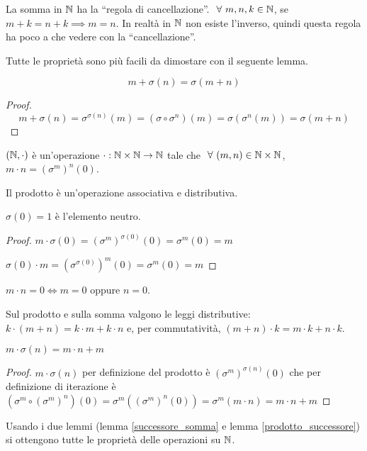 La somma in $\mathbb{N}$ ha la ``regola di cancellazione''. $\forall m, n, k \in \naturals$, se $m + k = n + k \implies m = n$. In realt\`a in $\mathbb{N}$ non esiste l'inverso, quindi questa regola ha poco a che vedere con la ``cancellazione''.

Tutte le propriet\`a sono pi\`u facili da dimostare con il seguente lemma.
\begin{lem}\label{successore_somma}
\[
m + \sigma (n) = \sigma(m + n)
\]
\end{lem}
\begin{proof}
\[
m + \sigma(n) = \sigma^{\sigma(n)} (m) = (\sigma \circ \sigma^n) (m) = \sigma ( \sigma^n (m) ) = \sigma(m + n)
\]
\end{proof}
\begin{defn}
$(\mathbb{N}, \cdot)$ \`e un'operazione $\cdot : \mathbb{N} \times \mathbb{N} \to \mathbb{N}$ tale che $\forall (m, n) \in \naturals \times \naturals$, $m \cdot n = (\sigma^m)^n(0)$.
\end{defn}
Il prodotto \`e un'operazione associativa e distributiva.

\begin{prop}
$\sigma(0) = 1$ \`e l'elemento neutro.
\end{prop}
\begin{proof}
$m \cdot \sigma(0) = (\sigma^m)^{\sigma(0)} (0) = \sigma^m (0) = m$

$\sigma(0) \cdot m = (\sigma^{\sigma(0)})^m (0) = \sigma^m (0) = m$
\end{proof}

\begin{defn}
$m \cdot n = 0 \iff m = 0 $ oppure $ n = 0 $.
\end{defn}

Sul prodotto e sulla somma valgono le leggi distributive: $k \cdot (m+n) = k \cdot m + k \cdot n$ e, per commutativit\`a, $(m + n) \cdot k = m \cdot k + n \cdot k$.
\begin{lem}\label{prodotto_successore}
$m \cdot \sigma(n) = m \cdot n + m$
\end{lem}
\begin{proof}
$m \cdot \sigma(n)$ per definizione del prodotto \`e $ (\sigma^m)^{\sigma(n)} (0) $ che per definizione di iterazione \`e $ (\sigma^m \circ (\sigma^m)^n) (0) = \sigma^m ( (\sigma^m)^n (0)) = \sigma^m (m \cdot n) = m \cdot n + m$
\end{proof}
Usando i due lemmi (lemma \ref{successore_somma} e lemma \ref{prodotto_successore}) si ottengono tutte le propriet\`a delle operazioni su $\mathbb{N}$.

